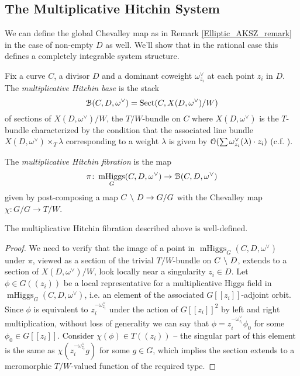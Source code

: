 \documentclass[10pt, oneside]{article}
\DeclareMathOperator{\mhiggs}{mHiggs}
\begin{document}
\subsection{The Multiplicative Hitchin System}
We can define the global Chevalley map as in Remark \ref{Elliptic_AKSZ_remark} in the case of non-empty $D$ as well.  We'll show that in the rational case this defines a completely integrable system structure.

\begin{definition} \label{mult_Hitchin_system_def}
Fix a curve $C$, a divisor $D$ and a dominant coweight $\omega_{z_i}^\vee$ at each point $z_i$ in $D$.  The \emph{multiplicative Hitchin base} is the stack
\[\mathcal{B}(C,D,\omega^\vee) = \mathrm{Sect}(C, X(D,\omega^\vee)/W)\]
of sections of $X(D,\omega^\vee)/W$, the $T/W$-bundle on $C$ where $X(D,\omega^\vee)$ is the $T$-bundle characterized by the condition that the associated line bundle $X(D,\omega^\vee) \times_T {\lambda}$ corresponding to a weight $\lambda$ is given by $\mathcal{O}(\sum \omega_{z_i}^\vee(\lambda) \cdot z_i)$ (c.f. \cite[Section 3.3]{HurtubiseMarkman}).

The \emph{multiplicative Hitchin fibration} is the map
\[\pi \colon \mhiggs_G(C,D,\omega^\vee) \to \mc B(C,D,\omega^\vee)\]
given by post-composing a map $C \ \backslash \  D \to G/G$ with the Chevalley map $\chi \colon G/G \to T/W$.  
\end{definition}

\begin{prop}
The multiplicative Hitchin fibration described above is well-defined.
\end{prop}

\begin{proof}
We need to verify that the image of a point in $\mhiggs_G(C,D,\omega^\vee)$ under $\pi$, viewed as a section of the trivial $T/W$-bundle on $C \ \backslash \  D$, extends to a section of $X(D,\omega^\vee)/W$, look locally near a singularity $z_i \in D$.  Let $\phi \in G((z_i))$ be a local representative for a multiplicative Higgs field in $\mhiggs_G(C,D,\omega^\vee)$, i.e. an element of the associated $G[[z_i]]$-adjoint orbit.  Since $\phi$ is equivalent to $z_i^{-\omega^\vee_{z_i}}$ under the action of $G[[z_i]]^2$ by left and right multiplication, without loss of generality we can say that $\phi = z_i^{-\omega^\vee_{z_i}} \phi_0$ for some $\phi_0 \in G[[z_i]]$.  Consider $\chi(\phi) \in T((z_i))$ -- the singular part of this element is the same as $\chi(z_i^{-\omega^\vee_{z_i}} g)$ for some $g \in G$, which implies the section extends to a meromorphic $T/W$-valued function of the required type.
\end{proof}
\end{document}
